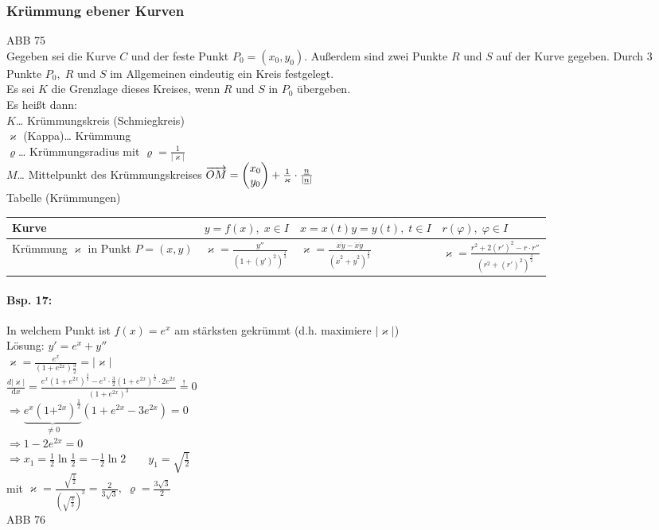 \subsubsection{Krümmung ebener Kurven}
ABB 75\\
Gegeben sei die Kurve $C$ und der feste Punkt $P_0=(x_0, y_0)$. Außerdem sind zwei Punkte $R$ und $S$ auf der Kurve gegeben. Durch 3 Punkte $P_0, \; R$ und $S$ im Allgemeinen eindeutig ein Kreis festgelegt.\\
Es sei $K$ die Grenzlage dieses Kreises, wenn $R$ und $S$ in $P_0$ übergeben.\\
Es heißt dann:\\
$K$… Krümmungskreis (Schmiegkreis)\\
$\varkappa$ (Kappa)… Krümmung\\
$\varrho$… Krümmungsradius mit $\varrho=\frac{1}{|\varkappa|}$\\
$M$… Mittelpunkt des Krümmungskreises $\overrightarrow{OM}=\begin{pmatrix}x_0 \\ y_0\end{pmatrix}+\frac{1}{\varkappa}\cdot \frac{\underline{n}}{|\underline{n}|}$\\
Tabelle (Krümmungen)\\
\begin{tabular}{L{.2} | L{.3} | L{.199} | L{.3}}
Kurve & $y=f(x),\;x\in I$ & $x=x(t)$\newline $y=y(t), \; t\in I$ & $r(\varphi), \; \varphi \in I$ \\
\hline 
Krümmung $\varkappa$ in Punkt $P=(x,y)$ & $\varkappa=\frac{y''}{(1+(y')^2)^{\tfrac{3}{2}}}$ & $\varkappa=\frac{\dot{x}\ddot{y}-\ddot{x}\dot{y}}{(\dot{x}^2+\dot{y}^2)^{\tfrac{3}{2}}}$ & $\varkappa=\frac{r^2+2(r')^2-r\cdot r''}{(r^2+(r')^2)^{\tfrac{3}{2}}}$
\end{tabular}
\paragraph{Bsp. 17:} In welchem Punkt ist $f(x)=e^x$ am stärksten gekrümmt (d.h. maximiere $|\varkappa|$)\\
Lösung: $y'=e^x+y''$\\
$\varkappa=\frac{e^x}{(1+e^{2x}){\tfrac{3}{2}}}=|\varkappa|$\\
$\frac{d|\varkappa|}{\mathrm{d}x}=\frac{e^x(1+e^{2x})^{\tfrac{3}{2}}-e^x\cdot\frac{3}{2}(1+e^{2x})^{\tfrac{1}{2}}\cdot 2e^{2x}}{(1+e^{2x})^3}\overset{!}{=}0$\\
$\Rightarrow\underbrace{e^x(1+^{2x})^{\tfrac{1}{2}}}_{\not = 0}(1+e^{2x}-3e^{2x})=0$\\
$\Rightarrow 1-2e^{2x}=0$\\
$\Rightarrow x_1 = \frac{1}{2}\ln \tfrac{1}{2}=-\frac{1}{2}\ln 2 \qquad y_1=\sqrt{\frac{1}{2}}$\\
mit $\varkappa = \frac{\sqrt{\frac{1}{2}}}{\left(\sqrt{\frac{3}{3}}\right)^3}=\frac{2}{3\sqrt{3}}, \; \varrho=\frac{3\sqrt{3}}{2}$\\
ABB 76
